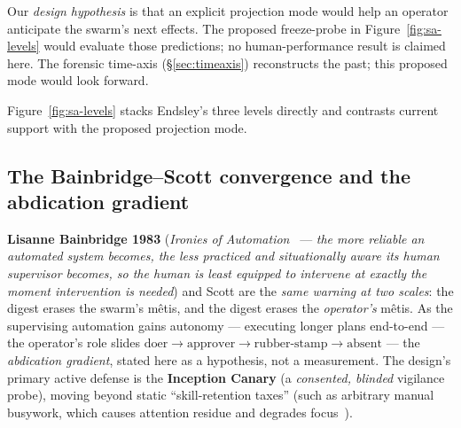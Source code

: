 \documentclass[11pt,a4paper]{article}
\theoremstyle{definition}
\theoremstyle{plain}
\begin{document}
Our \emph{design hypothesis} is that an explicit projection mode would help an
operator anticipate the swarm's next effects. The proposed freeze-probe in
Figure~\ref{fig:sa-levels} would evaluate those predictions; no human-performance
result is claimed here. The forensic time-axis (\S\ref{sec:timeaxis}) reconstructs
the past; this proposed mode would look forward.


Figure~\ref{fig:sa-levels} stacks Endsley's three levels directly and
contrasts current support with the proposed projection mode.

\subsection{The Bainbridge--Scott convergence and the abdication gradient}\label{sec:abdication}

\textbf{Lisanne Bainbridge 1983} (\emph{Ironies of Automation}~
--- \emph{the more reliable an automated system becomes, the less practiced and
situationally aware its human supervisor becomes, so the human is least equipped to
intervene at exactly the moment intervention is needed}) and Scott are the
\emph{same warning at two scales}: the digest erases the swarm's m\^etis, and the
digest erases the \emph{operator's} m\^etis. As the supervising automation gains
autonomy --- executing longer plans end-to-end --- the operator's role slides
$\text{doer}\to\text{approver}\to\text{rubber-stamp}\to\text{absent}$ --- the
\emph{abdication gradient}, stated here as a hypothesis, not a measurement. The design's primary active defense is the \textbf{Inception Canary} (a \emph{consented, blinded} vigilance probe), moving beyond static ``skill-retention taxes'' (such as arbitrary manual busywork, which causes attention residue and degrades focus~).
\end{document}
